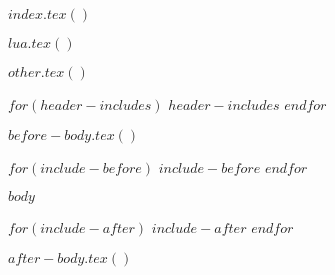 $index.tex()$

$lua.tex()$

$other.tex()$

$for(header-includes)$
$header-includes$
$endfor$





\pretextual

$before-body.tex()$

$for(include-before)$
$include-before$
$endfor$


\textual
$body$

$for(include-after)$
$include-after$
$endfor$

$after-body.tex()$


